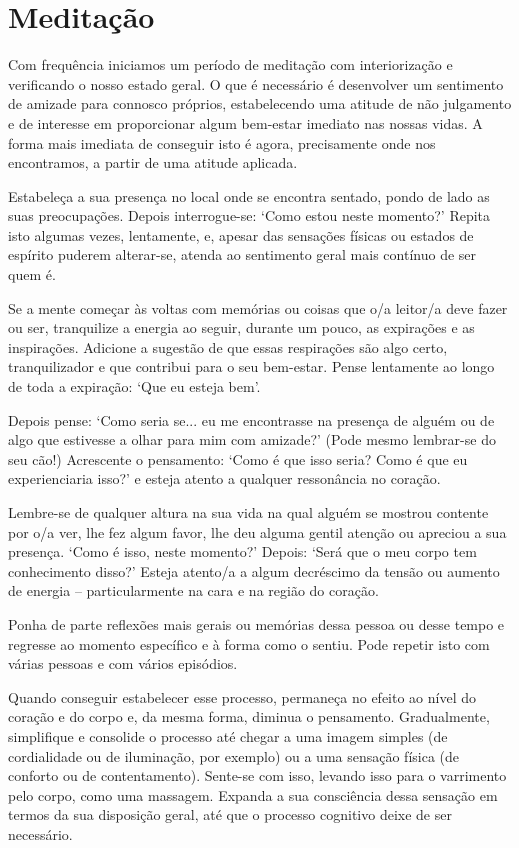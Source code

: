 
\chapter{Meditação}


Com frequência iniciamos um período de meditação com interiorização e
verificando o nosso estado geral. O que é necessário é desenvolver um sentimento
de amizade para connosco próprios, estabelecendo uma atitude de não julgamento e
de interesse em proporcionar algum bem-estar imediato nas nossas vidas. A forma
mais imediata de conseguir isto é agora, precisamente onde nos encontramos, a
partir de uma atitude aplicada.

Estabeleça a sua presença no local onde se encontra sentado, pondo de lado as
suas preocupações. Depois interrogue-se: `Como estou neste momento?' Repita isto
algumas vezes, lentamente, e, apesar das sensações físicas ou estados de
espírito puderem alterar-se, atenda ao sentimento geral mais contínuo de ser
quem é.

Se a mente começar às voltas com memórias ou coisas que o/a leitor/a deve fazer
ou ser, tranquilize a energia ao seguir, durante um pouco, as expirações e as
inspirações. Adicione a sugestão de que essas respirações são algo certo,
\mbox{tranquilizador} e que contribui para o seu bem-estar. Pense lentamente ao longo
de toda a expiração: `Que eu esteja bem'.

Depois pense: `Como seria se... eu me encontrasse na presença de alguém ou de
algo que estivesse a olhar para mim com amizade?' (Pode mesmo lembrar-se do seu
cão!) Acrescente o pensamento: `Como é que isso seria? Como é que eu
experienciaria isso?' e esteja atento a qualquer ressonância no coração.

Lembre-se de qualquer altura na sua vida na qual alguém se mostrou contente por
o/a ver, lhe fez algum favor, lhe deu alguma gentil atenção ou apreciou a sua
presença. `Como é isso, neste momento?' Depois: `Será que o meu corpo tem
conhecimento disso?' Esteja atento/a a algum decréscimo da tensão ou aumento de
energia -- particularmente na cara e na região do coração.

Ponha de parte reflexões mais gerais ou memórias dessa pessoa ou desse tempo e
regresse ao momento específico e à forma como o sentiu. Pode repetir isto com
várias pessoas e com vários episódios.

Quando conseguir estabelecer esse processo, permaneça no efeito ao nível do
coração e do corpo e, da mesma forma, diminua o pensamento. Gradualmente,
simplifique e consolide o processo até chegar a uma imagem simples (de
cordialidade ou de iluminação, por exemplo) ou a uma sensação física (de
conforto ou de contentamento). Sente-se com isso, levando isso para o varrimento
pelo corpo, como uma massagem. Expanda a sua consciência dessa sensação em
termos da sua disposição geral, até que o processo cognitivo deixe de ser
necessário.

